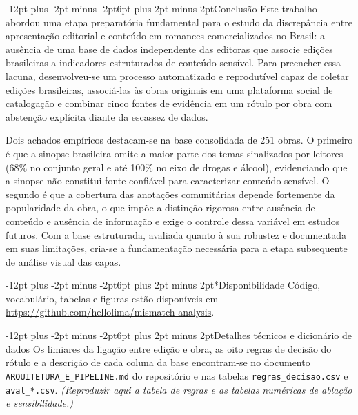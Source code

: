 \documentclass[12pt]{article}
\makeatletter
\renewcommand{\section}{\@startsection{section}{1}{\z@}%
  {-12pt plus -2pt minus -2pt}{6pt plus 2pt minus 2pt}{\normalfont\large\bfseries}}
\makeatother
\begin{document}
\section{Conclusão}
\label{sec:conclusao}
Este trabalho abordou uma etapa preparatória fundamental para o estudo da discrepância entre apresentação editorial e conteúdo em romances comercializados no Brasil: a ausência de uma base de dados independente das editoras que associe edições brasileiras a indicadores estruturados de conteúdo sensível. Para preencher essa lacuna, desenvolveu-se um processo automatizado e reprodutível capaz de coletar edições brasileiras, associá-las às obras originais em uma plataforma social de catalogação e combinar cinco fontes de evidência em um rótulo por obra com abstenção explícita diante da escassez de dados.

Dois achados empíricos destacam-se na base consolidada de 251 obras. O primeiro é que a sinopse brasileira omite a maior parte dos temas sinalizados por leitores (68\% no conjunto geral e até 100\% no eixo de drogas e álcool), evidenciando que a sinopse não constitui fonte confiável para caracterizar conteúdo sensível. O segundo é que a cobertura das anotações comunitárias depende fortemente da popularidade da obra, o que impõe a distinção rigorosa entre ausência de conteúdo e ausência de informação e exige o controle dessa variável em estudos futuros. Com a base estruturada, avaliada quanto à sua robustez e documentada em suas limitações, cria-se a fundamentação necessária para a etapa subsequente de análise visual das capas.

\section*{Disponibilidade}
Código, vocabulário, tabelas e figuras estão disponíveis em \url{https://github.com/hellolima/mismatch-analysis}.

\appendix
\section{Detalhes técnicos e dicionário de dados}
Os limiares da ligação entre edição e obra, as oito regras de decisão do rótulo e a descrição de cada coluna da base encontram-se no documento \texttt{ARQUITETURA\_E\_PIPELINE.md} do repositório e nas tabelas \texttt{regras\_decisao.csv} e \texttt{aval\_*.csv}. \emph{(Reproduzir aqui a tabela de regras e as tabelas numéricas de ablação e sensibilidade.)}
\end{document}
